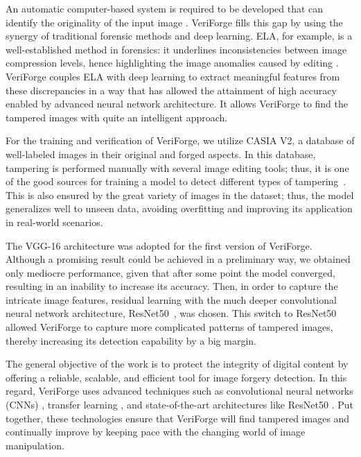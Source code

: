 \documentclass{ieeeaccess}
\begin{document}
An automatic computer-based system is required to be developed that can identify the originality of the input image \cite{9404748}. VeriForge fills this gap by using the synergy of traditional forensic methods and deep learning. ELA, for example, is a well-established method in forensics: it underlines inconsistencies between image compression levels, hence highlighting the image anomalies caused by editing \cite{singh2021image}. VeriForge couples ELA with deep learning to extract meaningful features from these discrepancies in a way that has allowed the attainment of high accuracy enabled by advanced neural network architecture. It allows VeriForge to find the tampered images with quite an intelligent approach.

For the training and verification of VeriForge, we utilize CASIA V2, a database of well-labeled images in their original and forged aspects. In this database, tampering is performed manually with several image editing tools; thus, it is one of the good sources for training a model to detect different types of tampering~\cite{7412439}. This is also ensured by the great variety of images in the dataset; thus, the model generalizes well to unseen data, avoiding overfitting and improving its application in real-world scenarios.

The VGG-16 architecture was adopted for the first version of VeriForge. Although a promising result could be achieved in a preliminary way, we obtained only mediocre performance, given that after some point the model converged, resulting in an inability to increase its accuracy. Then, in order to capture the intricate image features, residual learning with the much deeper convolutional neural network architecture, ResNet50~\cite{simonyan2015deepconvolutionalnetworkslargescale}, was chosen. This switch to ResNet50 allowed VeriForge to capture more complicated patterns of tampered images, thereby increasing its detection capability by a big margin.


The general objective of the work is to protect the integrity of digital content by offering a reliable, scalable, and efficient tool for image forgery detection. In this regard, VeriForge uses advanced techniques such as convolutional neural networks (CNNs) \cite{thepade2021image}, transfer learning \cite{han2020scene}, and state-of-the-art architectures like ResNet50 \cite{he2016deep}. Put together, these technologies ensure that VeriForge will find tampered images and continually improve by keeping pace with the changing world of image manipulation.
\end{document}
